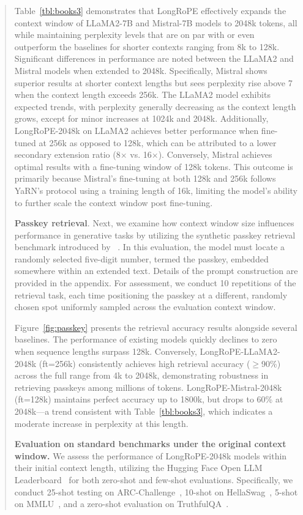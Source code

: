 \begin{abstract}
Table~\ref{tbl:books3} demonstrates that LongRoPE effectively expands the context window of LLaMA2-7B and Mistral-7B models to 2048k tokens, all while maintaining perplexity levels that are on par with or even outperform the baselines for shorter contexts ranging from 8k to 128k. Significant differences in performance are noted between the LLaMA2 and Mistral models when extended to 2048k. Specifically, Mistral shows superior results at shorter context lengths but sees perplexity rise above 7 when the context length exceeds 256k. The LLaMA2 model exhibits expected trends, with perplexity generally decreasing as the context length grows, except for minor increases at 1024k and 2048k. Additionally, LongRoPE-2048k on LLaMA2 achieves better performance when fine-tuned at 256k as opposed to 128k, which can be attributed to a lower secondary extension ratio (8$\times$ vs. 16$\times$). Conversely, Mistral achieves optimal results with a fine-tuning window of 128k tokens. This outcome is primarily because Mistral’s fine-tuning at both 128k and 256k follows YaRN's protocol using a training length of 16k, limiting the model’s ability to further scale the context window post fine-tuning.

\textbf{Passkey retrieval}. Next, we examine how context window size influences performance in generative tasks by utilizing the synthetic passkey retrieval benchmark introduced by ~\cite{passkey}. In this evaluation, the model must locate a randomly selected five-digit number, termed the passkey, embedded somewhere within an extended text. Details of the prompt construction are provided in the appendix. For assessment, we conduct 10 repetitions of the retrieval task, each time positioning the passkey at a different, randomly chosen spot uniformly sampled across the evaluation context window.

Figure~\ref{fig:passkey} presents the retrieval accuracy results alongside several baselines. The performance of existing models quickly declines to zero when sequence lengths surpass 128k. Conversely, LongRoPE-LLaMA2-2048k (ft=256k) consistently achieves high retrieval accuracy ($\ge$90\%) across the full range from 4k to 2048k, demonstrating robustness in retrieving passkeys among millions of tokens. LongRoPE-Mistral-2048k (ft=128k) maintains perfect accuracy up to 1800k, but drops to 60\% at 2048k—a trend consistent with Table~\ref{tbl:books3}, which indicates a moderate increase in perplexity at this length.

\textbf{Evaluation on standard benchmarks under the original context window.} We assess the performance of LongRoPE-2048k models within their initial context length, utilizing the Hugging Face Open LLM Leaderboard~\cite{huggingfaceboard} for both zero-shot and few-shot evaluations. Specifically, we conduct 25-shot testing on ARC-Challenge~\cite{allenai:arc}, 10-shot on HellaSwag~\cite{zellers2019hellaswag}, 5-shot on MMLU~\cite{mmlu}, and a zero-shot evaluation on TruthfulQA~\cite{lin2021truthfulqa}.


\end{abstract}
